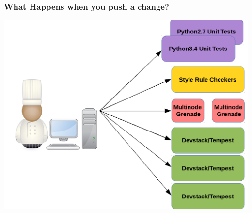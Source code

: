 \documentclass[aspectratio=169,11pt,hyperref={colorlinks=true}]{beamer}
\begin{document}
\begin{frame}
\frametitle{What Happens when you push a change?}
\begin{center}
	\includegraphics[width=.7\textwidth]{jobs.png}
\end{center}
\end{frame}
\end{document}
